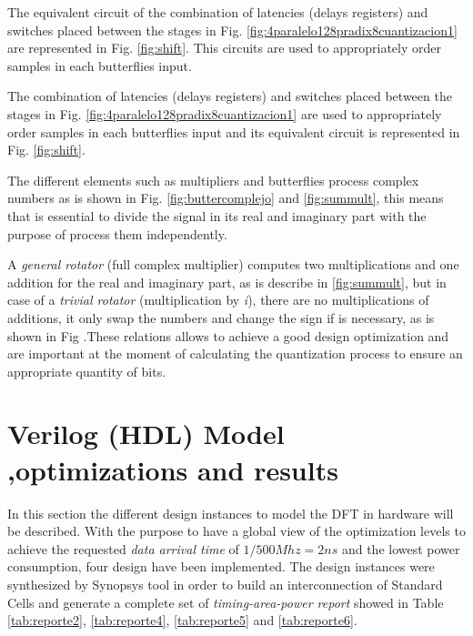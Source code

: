 \documentclass[journal,comsoc]{IEEEtran}
\begin{document}
The equivalent circuit of the combination of latencies (delays registers) and switches placed between the stages in Fig. \ref{fig:4paralelo128pradix8cuantizacion1} are represented in Fig. \ref{fig:shift}. This circuits are used to appropriately order samples in each butterflies input.

The combination of latencies (delays registers) and switches placed between the stages in Fig. \ref{fig:4paralelo128pradix8cuantizacion1} are used to appropriately order samples in each butterflies input and its equivalent circuit is represented in Fig. \ref{fig:shift}.

The different elements such as multipliers and butterflies process complex numbers as is shown in Fig. \ref{fig:buttercomplejo} and \ref{fig:summult}, this means that
is essential to divide the signal in its real and imaginary part with the purpose of process them independently.

A \textit{general rotator} (full complex multiplier) computes two multiplications and one addition for the real and imaginary part, as is describe in \ref{fig:summult}, but in case of a \textit{trivial rotator} (multiplication by  \textit{i}), there are no multiplications of additions, it only swap the numbers and change the sign if is necessary, as is shown in Fig .These relations allows to achieve a good design optimization and are important at the moment of calculating the quantization process to ensure an appropriate quantity of bits.



\section{Verilog (HDL) Model ,optimizations and results}  \label{sec:results}

In this section the different design instances to model the DFT in hardware will be described. With the purpose to have a global view of the optimization levels to achieve the requested \textit{data arrival time} of $1/500Mhz=2ns$ and the lowest power consumption, four design have been implemented. The design instances were synthesized by Synopsys tool in order to build an interconnection of Standard Cells and generate a complete set of \textit{timing-area-power report} showed in Table \ref{tab:reporte2}, \ref{tab:reporte4}, \ref{tab:reporte5} and  \ref{tab:reporte6}.
\end{document}
